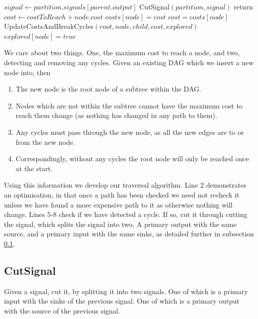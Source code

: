 \documentclass[12pt,final,oneside]{article} %
\begin{document}
\begin{algorithm}
\begin{algorithmic}[1]
            \State $signal \gets partition.signals[parent.output]$ 
            \State CutSignal$(partition, signal)$
            \State return
         \EndIf
         \State $cost \gets costToReach+node.cost$
            \State $costs[node] = cost$
         \Else
            \State $cost = costs[node]$
         \EndIf
            \State UpdateCostsAndBreakCycles$(root, node, child, cost, explored)$
         \EndFor
         \State $explored[node] = true$
      \EndProcedure
   \end{algorithmic}
\end{algorithm}
We care about two things. One, the maximum cost to reach a node, and two, detecting and removing any cycles.
Given an existing \ac{DAG}  which we insert a new node into, then
\begin{enumerate}
   \item The new node is the root node of a subtree within the \ac{DAG}.
   \item Nodes which are not within the subtree cannot have the maximum cost to reach them change (as nothing has changed in any path to them).
   \item Any cycles must pass through the new node, as all the new edges are to or from the new node.
   \item Correspondingly, without any cycles the root node will only be reached once at the start.
\end{enumerate}
Using this information we develop our traversal algorithm.
Line 2 demonstrates an optimisation, in that once a path has been checked we need not recheck it unless we have found a more expensive path to it as otherwise nothing will change.
Lines 5-8 check if we have detected a cycle. If so, cut it through cutting the signal, which splits the signal into two. A primary output with the same source, and a primary input with the same sinks, as detailed further in subsection \ref{cutsignal}.


\newpage
\subsection{CutSignal}\label{cutsignal}
Given a signal, cut it, by splitting it into two signals. One of which is a primary input with the sinks of the previous signal. One of which is a primary output with the source of the previous signal.
\end{document}
